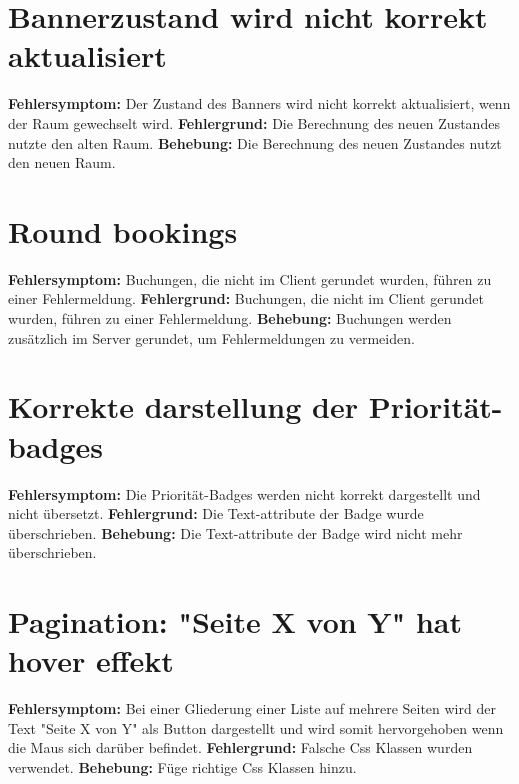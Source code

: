 \section{Bannerzustand wird nicht korrekt aktualisiert}
\textbf{Fehlersymptom:} Der Zustand des Banners wird nicht korrekt aktualisiert, wenn der Raum gewechselt wird.
\textbf{Fehlergrund:} Die Berechnung des neuen Zustandes nutzte den alten Raum.
\textbf{Behebung:} Die Berechnung des neuen Zustandes nutzt den neuen Raum.

\section{Round bookings}
\textbf{Fehlersymptom:} Buchungen, die nicht im Client gerundet wurden, führen zu einer Fehlermeldung.
\textbf{Fehlergrund:} Buchungen, die nicht im Client gerundet wurden, führen zu einer Fehlermeldung.
\textbf{Behebung:} Buchungen werden zusätzlich im Server gerundet, um Fehlermeldungen zu vermeiden.

\section{Korrekte darstellung der Priorität-badges}
\textbf{Fehlersymptom:} Die Priorität-Badges werden nicht korrekt dargestellt und nicht übersetzt.
\textbf{Fehlergrund:} Die Text-attribute der Badge wurde überschrieben.
\textbf{Behebung:} Die Text-attribute der Badge wird nicht mehr überschrieben.

\section{Pagination: "Seite X von Y" hat hover effekt}
\textbf{Fehlersymptom:} Bei einer Gliederung einer Liste auf mehrere Seiten wird der Text "Seite X von Y" als Button dargestellt und wird somit hervorgehoben wenn die Maus sich darüber befindet.
\textbf{Fehlergrund:} Falsche Css Klassen wurden verwendet.
\textbf{Behebung:} Füge richtige Css Klassen hinzu.

